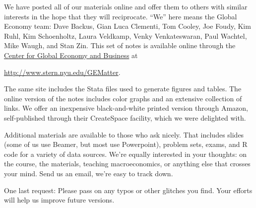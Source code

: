 We have posted all of our materials online
and offer them to others with similar interests in the hope
that they will reciprocate.
``We'' here means the Global Economy team:
Dave Backus, Gian Luca Clementi, Tom Cooley, Joe Foudy, Kim Ruhl, Kim Schoenholtz,
Laura Veldkamp, Venky Venkateswaran, Paul Wachtel, Mike Waugh, and Stan Zin.
This set of notes is available online
through the
\href{http://www.stern.nyu.edu/experience-stern/about/departments-centers-initiatives/centers-of-research/global-economy-business/index.htm}
{Center for Global Economy and Business}
at

\vspace*{\parskip}
\centerline{\url{http://www.stern.nyu.edu/GEMatter}.}

The same site includes the Stata files used to generate figures and tables.
The online version of the notes includes color graphs
and an extensive collection of links.
We offer an inexpensive black-and-white printed version through Amazon,
self-published through their CreateSpace facility,
which we were delighted with.

Additional materials are available to those who ask nicely.
That includes slides (some of us use Beamer, but most use Powerpoint),
problem sets, exams, and R code for a variety of data sources.
We're equally interested in your thoughts:  on the course,
the materials, teaching macroeconomics, or anything else that crosses
your mind.
Send us an email, we're easy to track down.

One last request:  Please pass on any typos or other glitches you find.
Your efforts will help us improve future versions.

